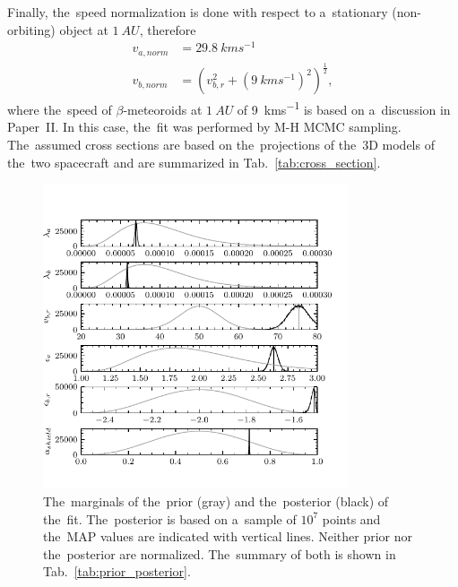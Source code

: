 Finally, the~speed normalization is done with respect to a~stationary (non-orbiting) object at $\SI{1}{AU}$, therefore
\begin{equation}\begin{split}
    v_{a,norm} & = \SI{29.8}{kms^{-1}} \\
    v_{b,norm} & = \left( v_{b,r}^2 + \left(\SI{9}{kms^{-1}}\right)^2 \right)^\frac{1}{2},
\end{split}\end{equation}
where the~speed of $\beta$-meteoroids at $\SI{1}{AU}$ of \SI{9}{kms^{-1}} is based on a~discussion in Paper~II. In this case, the~fit was performed by M-H MCMC sampling. The~assumed cross sections are based on the~projections of the~3D models \citep{psp_model,solo_model} of the~two spacecraft and are summarized in Tab.~\ref{tab:cross_section}.

\begin{figure}[ht]
 	\centering
 	\includegraphics[width=9cm]{figures/both_shield.pdf}
 	\caption{The~marginals of the~prior (gray) and the~posterior (black) of the~fit. The~posterior is based on a~sample of $10^7$ points and the~MAP values are indicated with vertical lines. Neither prior nor the~posterior are normalized. The~summary of both is shown in Tab.~\ref{tab:prior_posterior}.}
 	\label{fig:fit_posteriors}
\end{figure}

